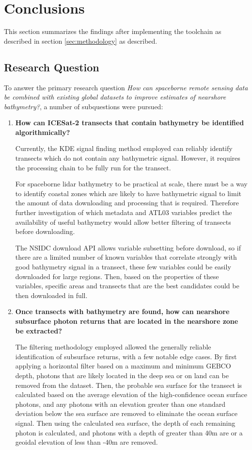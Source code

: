 \chapter{Conclusions}
This section summarizes the findings after implementing the toolchain as described in section \ref{sec:methodology} as described.

\section{Research Question}
To answer the primary research question \emph{How can spaceborne remote sensing data be combined with existing global datasets to improve estimates of nearshore bathymetry?}, a number of subquestions were pursued:

\begin{enumerate}
    \item \textbf{How can ICESat-2 transects that contain bathymetry be identified algorithmically?}

    Currently, the KDE signal finding method employed can reliably identify transects which do not contain any bathymetric signal. However, it requires the processing chain to be fully run for the transect. 
    
    For spaceborne lidar bathymetry to be practical at scale, there must be a way to identify coastal zones which are likely to have bathymetric signal to limit the amount of data downloading and processing that is required. Therefore further investigation of which metadata and ATL03 variables predict the availability of useful bathymetry would allow better filtering of transects before downloading. 
    
    The NSIDC download API allows variable subsetting before download, so if there are a limited number of known variables that correlate strongly with good bathymetry signal in a transect, these few variables could be easily downloaded for large regions.  
    Then, based on the properties of these variables, specific areas and transects that are the best candidates could be then downloaded in full.
    
    \item \textbf{Once transects with bathymetry are found, how can nearshore subsurface photon returns that are located in the nearshore zone be extracted?}
    
    The filtering methodology employed allowed the generally reliable identification of subsurface returns, with a few notable edge cases. By first applying a horizontal filter based on a maximum and minimum GEBCO depth, photons that are likely located in the deep sea or on land can be removed from the dataset. Then, the probable sea surface for the transect is calculated based on the average elevation of the high-confidence ocean surface photons, and any photons with an elevation greater than one standard deviation below the sea surface are removed to eliminate the ocean surface signal. Then using the calculated sea surface, the depth of each remaining photon is calculated, and photons with a depth of greater than 40m are or a geoidal elevation of less than -40m are removed. 
    

\end{enumerate}
